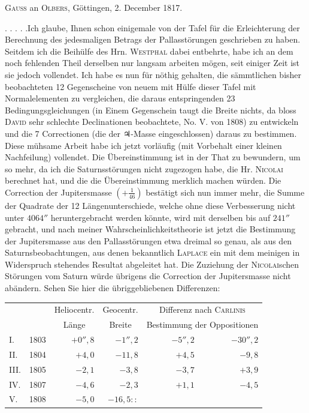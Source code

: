 \par{}\bigskip
\begin{center}
\textsc{Gauss} an \textsc{Olbers}, Göttingen, 2. December 1817.
\end{center}
\noindent\hspace*{\parindent}. . . . .\quad Ich glaube, Ihnen schon einigemale von der Tafel für die Erleichterung der Berechnung des jedesmaligen Betrags der Pallasstörungen geschrieben zu haben. Seitdem ich die Beihülfe des Hrn. \textsc{Westphal} dabei entbehrte, habe ich an dem noch fehlenden Theil derselben nur langsam arbeiten mögen, seit einiger Zeit ist sie jedoch vollendet. Ich habe es nun für nöthig gehalten, die sämmtlichen bisher beobachteten 12 Gegenscheine von neuem mit Hülfe dieser Tafel mit Normalelementen zu vergleichen, die daraus entspringenden 23 Bedingungsgleichungen (in Einem Gegenschein taugt die Breite nichts, da bloss \textsc{David} sehr schlechte Declinationen beobachtete, No. V. von 1808) zu entwickeln und die 7 Correctionen (die der {\AstroSymbols ♃}-Masse eingeschlossen) daraus zu bestimmen. Diese mühsame Arbeit habe ich jetzt vorläufig (mit Vorbehalt einer kleinen Nachfeilung) vollendet. Die Übereinstimmung ist in der That zu bewundern, um so mehr, da ich die Saturnsstörungen nicht zugezogen habe, die Hr. \textsc{Nicolai} berechnet hat, und die die Übereinstimmung merklich  machen würden. Die Correction der Jupitersmasse \((+\frac{1}{46})\) bestätigt sich nun immer mehr, die Summe der Quadrate der 12 Längenunterschiede, welche ohne diese Verbesserung nicht unter \(4064''\) heruntergebracht werden könnte, wird mit derselben bis auf \(241''\) gebracht, und nach meiner Wahrscheinlichkeitstheorie ist jetzt die Bestimmung der Jupitersmasse aus den Pallasstörungen etwa dreimal so genau, als aus den Saturnsbeobachtungen, aus denen bekanntlich \textsc{Laplace} ein mit dem meinigen in Widerspruch stehendes Resultat abgeleitet hat. Die Zuziehung der \textsc{Nicolai}schen Störungen vom Saturn würde übrigens die Correction der Jupitersmasse nicht abändern. Sehen Sie hier die übriggebliebenen Differenzen:
\begin{center}
\begingroup\small\setlength{\tabcolsep}{5pt}
\begin{tabular}{@{}lr r r r r@{}}
&&\multicolumn{1}{c}{Heliocentr.}&\multicolumn{1}{c}{Geocentr.}&\multicolumn{2}{c}{Differenz nach \textsc{Carlinis}}\\
&&\multicolumn{1}{c}{Länge}&\multicolumn{1}{c}{Breite}&\multicolumn{2}{c}{Bestimmung der Oppositionen}\\[3pt]
I.&1803&\(+0''{,}8\)&\(-1''{,}2\)&\(-5''{,}2\)&\(-30''{,}2\)\\
II.&1804&\(+4{,}0\)&\(-11{,}8\)&\(+4{,}5\)&\(-9{,}8\)\\
III.&1805&\(-2{,}1\)&\(-3{,}8\)&\(-3{,}7\)&\(+3{,}9\)\\
IV.&1807&\(-4{,}6\)&\(-2{,}3\)&\(+1{,}1\)&\(-4{,}5\)\\
V.&1808&\(-5{,}0\)&\(-16{,}5\mathpunct{::}\)&&
\end{tabular}
\endgroup
\end{center}

